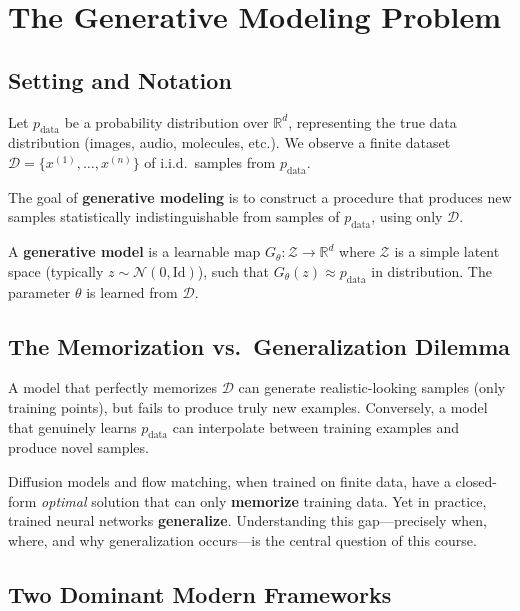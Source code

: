 \documentclass[11pt, a4paper]{article}
\newcommand{\Rd}{\mathbb{R}}
\newcommand{\Id}{\mathrm{Id}}
\newcommand{\pdata}{p_{\mathrm{data}}}
\theoremstyle{plain}
\theoremstyle{definition}
\theoremstyle{remark}
\begin{document}
\section{The Generative Modeling Problem}

\subsection{Setting and Notation}

Let $\pdata$ be a probability distribution over $\Rd^d$, representing the true data distribution (images, audio, molecules, etc.). We observe a finite dataset $\mathcal{D} = \{x^{(1)}, \ldots, x^{(n)}\}$ of i.i.d.\ samples from $\pdata$.

The goal of \textbf{generative modeling} is to construct a procedure that produces new samples statistically indistinguishable from samples of $\pdata$, using only $\mathcal{D}$.

\begin{defbox}
A \textbf{generative model} is a learnable map $G_\theta : \mathcal{Z} \to \Rd^d$ where $\mathcal{Z}$ is a simple latent space (typically $z \sim \mathcal{N}(0,\Id)$), such that $G_\theta(z) \approx \pdata$ in distribution. The parameter $\theta$ is learned from $\mathcal{D}$.
\end{defbox}

\subsection{The Memorization vs.\ Generalization Dilemma}

A model that perfectly memorizes $\mathcal{D}$ can generate realistic-looking samples (only training points), but fails to produce truly new examples. Conversely, a model that genuinely learns $\pdata$ can interpolate between training examples and produce novel samples.

\begin{keybox}
Diffusion models and flow matching, when trained on finite data, have a closed-form \emph{optimal} solution that can only \textbf{memorize} training data. Yet in practice, trained neural networks \textbf{generalize}. Understanding this gap---precisely when, where, and why generalization occurs---is the central question of this course.
\end{keybox}

\subsection{Two Dominant Modern Frameworks}
\end{document}

